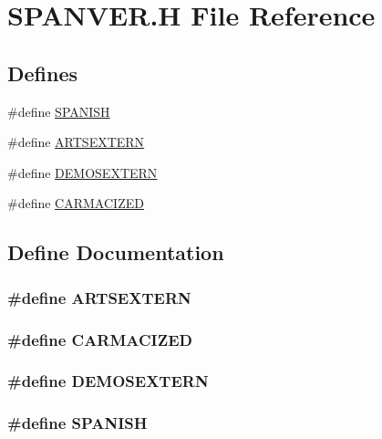 \hypertarget{SPANVER_8H}{
\section{SPANVER.H File Reference}
\label{SPANVER_8H}
}
\subsection*{Defines}
\begin{DoxyCompactItemize}
\item 
\#define \hyperlink{SPANVER_8H_a65c29c625a2b458499b51cc1987e7cae}{SPANISH}
\item 
\#define \hyperlink{SPANVER_8H_a36e8622d432bb1dcfc61ac233148b685}{ARTSEXTERN}
\item 
\#define \hyperlink{SPANVER_8H_aa38bbec192ab8931f108d382f7833c31}{DEMOSEXTERN}
\item 
\#define \hyperlink{SPANVER_8H_ab1d0a23b2e2640f4fbf73f30b3586f1b}{CARMACIZED}
\end{DoxyCompactItemize}


\subsection{Define Documentation}
\hypertarget{SPANVER_8H_a36e8622d432bb1dcfc61ac233148b685}{
\subsubsection[{ARTSEXTERN}]{\setlength{\rightskip}{0pt plus 5cm}\#define ARTSEXTERN}}
\label{SPANVER_8H_a36e8622d432bb1dcfc61ac233148b685}
\hypertarget{SPANVER_8H_ab1d0a23b2e2640f4fbf73f30b3586f1b}{
\subsubsection[{CARMACIZED}]{\setlength{\rightskip}{0pt plus 5cm}\#define CARMACIZED}}
\label{SPANVER_8H_ab1d0a23b2e2640f4fbf73f30b3586f1b}
\hypertarget{SPANVER_8H_aa38bbec192ab8931f108d382f7833c31}{
\subsubsection[{DEMOSEXTERN}]{\setlength{\rightskip}{0pt plus 5cm}\#define DEMOSEXTERN}}
\label{SPANVER_8H_aa38bbec192ab8931f108d382f7833c31}
\hypertarget{SPANVER_8H_a65c29c625a2b458499b51cc1987e7cae}{
\subsubsection[{SPANISH}]{\setlength{\rightskip}{0pt plus 5cm}\#define SPANISH}}
\label{SPANVER_8H_a65c29c625a2b458499b51cc1987e7cae}
